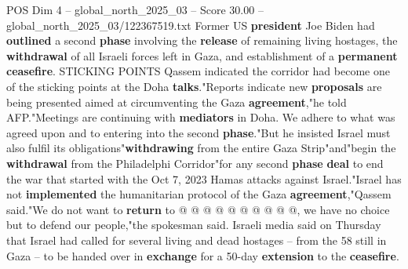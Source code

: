 \begin{textsample}{POS Dim 4 – global\_north\_2025\_03 – Score 30.00 – global\_north\_2025\_03/122367519.txt}
Former US \textbf{president} Joe Biden had \textbf{outlined} a second \textbf{phase} involving the \textbf{release} of remaining living hostages, the \textbf{withdrawal} of all Israeli forces left in Gaza, and establishment of a \textbf{permanent} \textbf{ceasefire}.
STICKING POINTS Qassem indicated the corridor had become one of the sticking points at the Doha \textbf{talks}."Reports indicate new \textbf{proposals} are being presented aimed at circumventing the Gaza \textbf{agreement},"he told AFP."Meetings are continuing with \textbf{mediators} in Doha.
We adhere to what was agreed upon and to entering into the second \textbf{phase}."But he insisted Israel must also fulfil its obligations"\textbf{withdrawing} from the entire Gaza Strip"and"begin the \textbf{withdrawal} from the Philadelphi Corridor"for any second \textbf{phase} \textbf{deal} to end the war that started with the Oct 7, 2023 Hamas attacks against Israel."Israel has not \textbf{implemented} the humanitarian protocol of the Gaza \textbf{agreement},"Qassem said."We do not want to \textbf{return} to @ @ @ @ @ @ @ @ @ @, we have no choice but to defend our people,"the spokesman said.
Israeli media said on Thursday that Israel had called for several living and dead hostages -- from the 58 still in Gaza -- to be handed over in \textbf{exchange} for a 50-day \textbf{extension} to the \textbf{ceasefire}.

\end{textsample}
